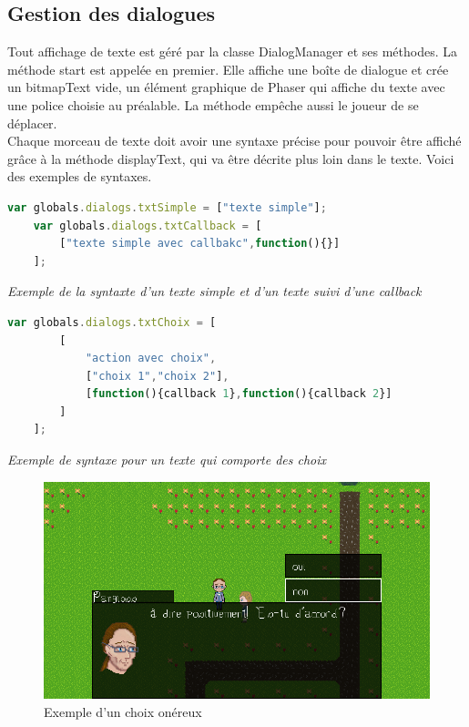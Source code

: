 \documentclass[11pt]{article}
\begin{document}
\subsection{Gestion des dialogues}
Tout affichage de texte est géré par la classe DialogManager et ses méthodes. 
La méthode start est appelée en premier. Elle affiche une boîte de dialogue et crée un bitmapText vide, un élément graphique de Phaser qui affiche du texte avec une police choisie au préalable. La méthode empêche aussi le joueur de se déplacer. \\
Chaque morceau de texte doit avoir une syntaxe précise pour pouvoir être affiché grâce à la méthode displayText, qui va être décrite plus loin dans le texte. Voici des exemples de syntaxes.
\begin{lstlisting}[language=JavaScript]
	var globals.dialogs.txtSimple = ["texte simple"];
	var globals.dialogs.txtCallback = [
		["texte simple avec callbakc",function(){}]
	];
\end{lstlisting}
\textit{Exemple de la syntaxte d'un texte simple et d'un texte suivi d'une callback}\\
\begin{lstlisting}[language=JavaScript]
	var globals.dialogs.txtChoix = [
		[
			"action avec choix",
			["choix 1","choix 2"],
			[function(){callback 1},function(){callback 2}]
		]
	];
\end{lstlisting} 
\textit{Exemple de syntaxe pour un texte qui comporte des choix}\\
\begin{figure}[h]
\includegraphics[scale=0.33]{choix}
\centering
\caption{Exemple d'un choix onéreux}

\end{figure}
\end{document}
